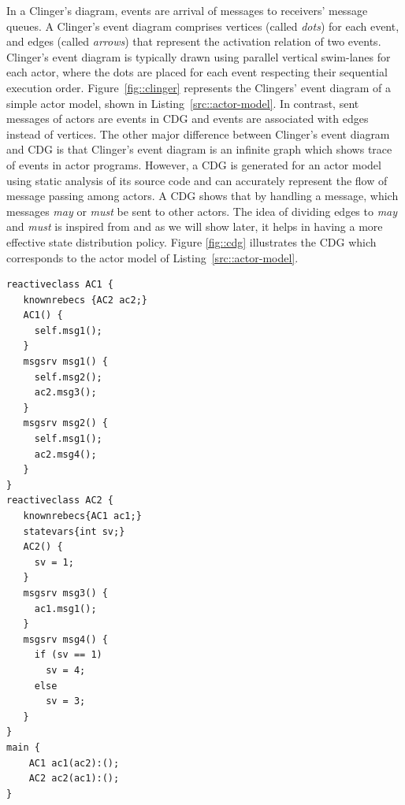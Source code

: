 In a Clinger's diagram, events are arrival of messages to receivers' message queues. A Clinger's event diagram comprises vertices (called \emph{dots}) for each event, and edges (called \emph{arrows}) that represent the activation relation of two events. Clinger's event diagram is typically drawn using parallel vertical swim-lanes for each actor, where the dots are placed for each event respecting their sequential execution order. Figure~\ref{fig::clinger} represents the Clingers' event diagram of a simple actor model, shown in Listing~\ref{src::actor-model}. In contrast, sent messages of actors are events in CDG and events are associated with edges instead of vertices. The other major difference between Clinger's event diagram and CDG is that Clinger's event diagram is an infinite graph which shows trace of events in actor programs. However, a CDG is generated for an actor model using static analysis of its source code and can accurately represent the flow of message passing among actors. A CDG shows that by handling a message, which messages \emph{may} or \emph{must} be sent to other actors. The idea of dividing edges to \emph{may} and \emph{must} is inspired from \cite{DBLP:conf/lics/LarsenT88} and as we will show later, it helps in having a more effective state distribution policy. Figure \ref{fig::cdg} illustrates the CDG which corresponds to the actor model of Listing~\ref{src::actor-model}.

\begin{lstlisting}[language=rebeca, caption= A simple actor model (from \cite{DBLP:journals/eceasst/KhamespanahSMSR15}), label=src::actor-model]
reactiveclass AC1 {
   knownrebecs {AC2 ac2;}
   AC1() {
     self.msg1();
   }
   msgsrv msg1() {
     self.msg2();
     ac2.msg3();
   }
   msgsrv msg2() {
     self.msg1();
     ac2.msg4();
   }
}
reactiveclass AC2 {
   knownrebecs{AC1 ac1;}
   statevars{int sv;}
   AC2() {
     sv = 1;
   }
   msgsrv msg3() {
     ac1.msg1();
   }
   msgsrv msg4() {
     if (sv == 1)
       sv = 4;
     else
       sv = 3;
   }
}
main {
    AC1 ac1(ac2):();
    AC2 ac2(ac1):();
}
\end{lstlisting}

